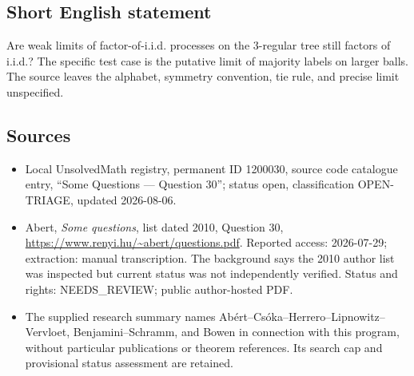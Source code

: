 \documentclass[11pt]{article}
\begin{document}
\subsection{Short English statement}
Are weak limits of factor-of-i.i.d. processes on the $3$-regular tree still factors of i.i.d.? The specific test case is the putative limit of majority labels on larger balls. The source leaves the alphabet, symmetry convention, tie rule, and precise limit unspecified.
\subsection{Sources}
\begin{itemize}
\item Local UnsolvedMath registry, permanent ID 1200030, source code catalogue entry, ``Some Questions --- Question 30''; status open, classification OPEN-TRIAGE, updated 2026-08-06.
\item Abert, \emph{Some questions}, list dated 2010, Question 30, \url{https://www.renyi.hu/~abert/questions.pdf}. Reported access: 2026-07-29; extraction: manual transcription. The background says the 2010 author list was inspected but current status was not independently verified. Status and rights: NEEDS\_REVIEW; public author-hosted PDF.
\item The supplied research summary names Ab\'ert--Cs\'oka--Herrero--Lipnowitz--Vervloet, Benjamini--Schramm, and Bowen in connection with this program, without particular publications or theorem references. Its search cap and provisional status assessment are retained.
\end{itemize}
\end{document}
